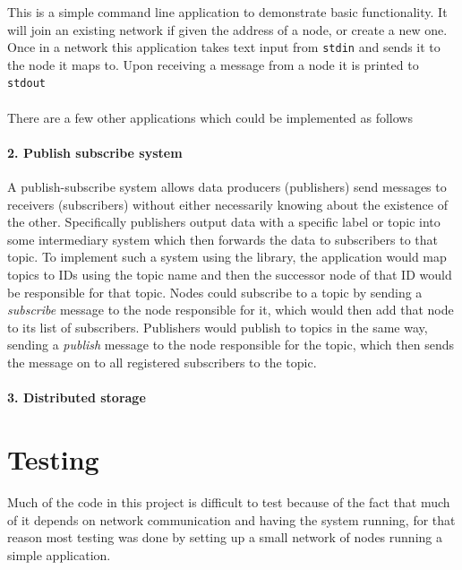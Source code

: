 \documentclass{article}
\begin{document}
This is a simple command line application to demonstrate basic functionality. It will join an existing network if given the address of a node, or create a new one. Once in a network this application takes text input from \texttt{stdin} and sends it to the node it maps to. Upon receiving a message from a node it is printed to \texttt{stdout}
\\
\\

There are a few other applications which could be implemented as follows

\paragraph{2. Publish subscribe system} A publish-subscribe system allows data producers (publishers) send messages to receivers (subscribers) without either necessarily knowing about the existence of the other. Specifically publishers output data with a specific label or topic into some intermediary system which then forwards the data to subscribers to that topic.
To implement such a system using the library, the application would map topics to IDs using the topic name and then the successor node of that ID would be responsible for that topic. Nodes could subscribe to a topic by sending a \textit{subscribe} message to the node responsible for it, which would then add that node to its list of subscribers. Publishers would publish to topics in the same way, sending a \textit{publish} message to the node responsible for the topic, which then sends the message on to all registered subscribers to the topic.


\paragraph{3. Distributed storage}


\section{Testing}

Much of the code in this project is difficult to test because of the fact that much of it depends on network communication and having the system running, for that reason most testing was done by setting up a small network of nodes running a simple application.
\end{document}
